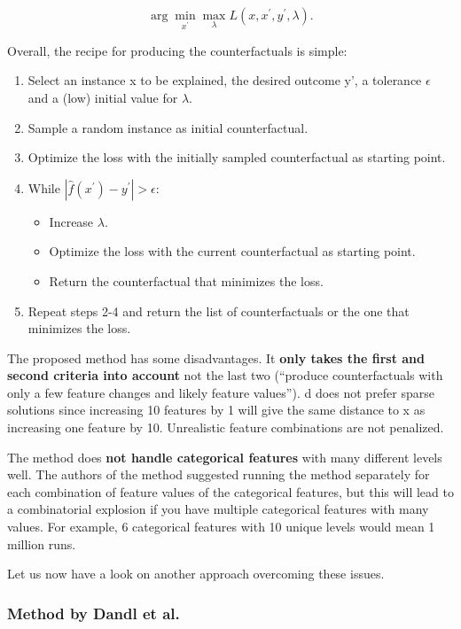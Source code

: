 \documentclass[12pt,]{krantz}
\providecommand{\tightlist}{%
  \setlength{\itemsep}{0pt}\setlength{\parskip}{0pt}}
\begin{document}
\[\arg\min_{x^\prime}\max_{\lambda}L(x,x^\prime,y^\prime,\lambda).\]

Overall, the recipe for producing the counterfactuals is simple:

\begin{enumerate}
\def\labelenumi{\arabic{enumi}.}
\tightlist
\item
  Select an instance x to be explained, the desired outcome y', a
  tolerance \(\epsilon\) and a (low) initial value for \(\lambda\).
\item
  Sample a random instance as initial counterfactual.
\item
  Optimize the loss with the initially sampled counterfactual as
  starting point.
\item
  While \(|\hat{f}(x^\prime)-y^\prime|>\epsilon\):

  \begin{itemize}
  \tightlist
  \item
    Increase \(\lambda\).
  \item
    Optimize the loss with the current counterfactual as starting point.
  \item
    Return the counterfactual that minimizes the loss.
  \end{itemize}
\item
  Repeat steps 2-4 and return the list of counterfactuals or the one
  that minimizes the loss.
\end{enumerate}

The proposed method has some disadvantages. It \textbf{only takes the
first and second criteria into account} not the last two (``produce
counterfactuals with only a few feature changes and likely feature
values''). d does not prefer sparse solutions since increasing 10
features by 1 will give the same distance to x as increasing one feature
by 10. Unrealistic feature combinations are not penalized.

The method does \textbf{not handle categorical features} with many
different levels well. The authors of the method suggested running the
method separately for each combination of feature values of the
categorical features, but this will lead to a combinatorial explosion if
you have multiple categorical features with many values. For example, 6
categorical features with 10 unique levels would mean 1 million runs.

Let us now have a look on another approach overcoming these issues.

\subsubsection{Method by Dandl et al.}\label{method-by-dandl-et-al.}
\end{document}
